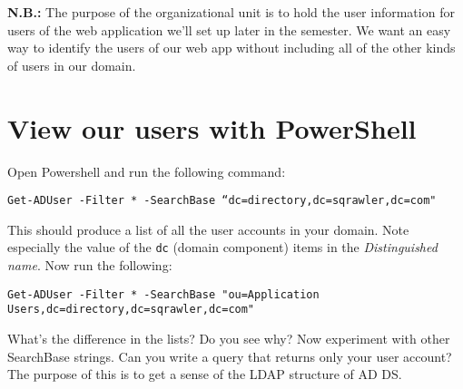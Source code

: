 \documentclass{article}
\begin{document}
\textbf{N.B.:} The purpose of the organizational unit is to hold the user information for users of the web application we'll set up later in the semester. We want an easy way to identify the users of our web app without including all of the other kinds of users in our domain.

\section{View our users with PowerShell}
Open Powershell and run the following command: 

\texttt{Get-ADUser -Filter * -SearchBase ``dc=directory,dc=sqrawler,dc=com"}

This should produce a list of all the user accounts in your domain.  Note especially the value of the \texttt{dc} (domain component) items in the \emph{Distinguished name}. Now run the following:

\texttt{Get-ADUser -Filter * -SearchBase "ou=Application Users,dc=directory,dc=sqrawler,dc=com"}

What's the difference in the lists? Do you see why?  Now experiment with other SearchBase strings. Can you write a query that returns only your user account? The purpose of this is to get a sense of the LDAP
structure of AD DS.
\end{document}

